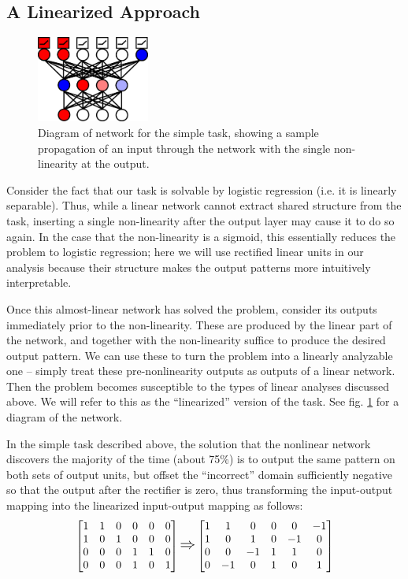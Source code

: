 \documentclass[10pt,letterpaper]{article}
\begin{document}
\subsection{A Linearized Approach}
\begin{figure}
\centering
\includegraphics[width=0.33\textwidth]{figures/network_diagram.png}
\caption{Diagram of network for the simple task, showing a sample propagation of an input through the network with the single non-linearity at the output.}
\label{network_diagram}
\end{figure}
Consider the fact that our task is solvable by logistic regression (i.e. it is linearly separable). Thus, while a linear network cannot extract shared structure from the task, inserting a single non-linearity after the output layer may cause it to do so again. In the case that the non-linearity is a sigmoid, this essentially reduces the problem to logistic regression; here we will use rectified linear units in our analysis because their structure makes the output patterns more intuitively interpretable. \par 
Once this almost-linear network has solved the problem, consider its outputs immediately prior to the non-linearity. These are produced by the linear part of the network, and together with the non-linearity suffice to produce the desired output pattern. We can use these to turn the problem into a linearly analyzable one -- simply treat these pre-nonlinearity outputs as outputs of a linear network. Then the problem becomes susceptible to the types of linear analyses discussed above. We will refer to this as the ``linearized'' version of the task. See fig. \ref{network_diagram} for a diagram of the network. \par 
In the simple task described above, the solution that the nonlinear network discovers the majority of the time (about 75\%) is to output the same pattern on both sets of output units, but offset the ``incorrect'' domain sufficiently negative so that the output after the rectifier is zero, thus transforming the input-output mapping into the linearized input-output mapping as follows:
\[
\left[ \begin{matrix} 
1 & 1 & 0 & 0 & 0 & 0 \\
1 & 0 & 1 & 0 & 0 & 0 \\
 0 & 0 & 0 & 1 & 1 & 0\\
 0 & 0 & 0 & 1 & 0 & 1\\
\end{matrix}  \right] 
\mathlarger{\mathlarger{\Rightarrow}}
\left[ \begin{matrix} 
1 & 1 & 0 & 0 & 0 & -1 \\
1 & 0 & 1 & 0 & -1 & 0 \\
 0 & 0 & -1 & 1 & 1 & 0\\
 0 & -1 & 0 & 1 & 0 & 1\\
\end{matrix}  \right] 
\] 
\end{document}
